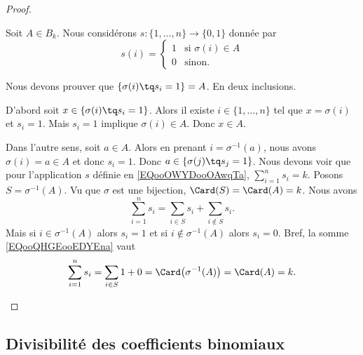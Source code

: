 \begin{proof}
\begin{subproof}
		Soit \( A\in B_k\). Nous considérons \(s \colon \{ 1,\ldots,n \}\to \{ 0,1 \}  \) donnée par
		\begin{equation}		\label{EQooOWYDooOAwqTa}
			s(i)=\begin{cases}
				1 & \text{si } \sigma(i)\in A \\
				0 & \text{sinon. }
			\end{cases}
		\end{equation}
		\begin{subproof}
			\spitem[\( \varphi(s)=A\)]
			Nous devons prouver que \( \{ \sigma(i)\tq s_i=1 \}=A\). En deux inclusions.

			D'abord soit \( x\in\{ \sigma(i)\tq s_i=1 \}\). Alors il existe \( i\in\{ 1,\ldots,n \}\) tel que \( x=\sigma(i)\) et \( s_i=1\). Mais \( s_i=1\) implique \( \sigma(i)\in A\). Donc \( x\in A\).

			Dans l'autre sens, soit \( a\in A\). Alors en prenant \( i=\sigma^{-1}(a)\), nous avons \( \sigma(i)=a\in A\) et donc \( s_i=1\). Donc \( a\in\{ \sigma(j)\tq s_j=1 \}\).
			\spitem[\( s\in C_k\)]
			Nous devons voir que pour l'application \( s\) définie en \eqref{EQooOWYDooOAwqTa}, \( \sum_{i=1}^ns_i=k\). Posons \( S=\sigma^{-1}(A)\). Vu que \( \sigma\) est une bijection, \( \Card(S)=\Card(A)=k\). Nous avons
			\begin{equation}		\label{EQooQHGEooEDYEna}
				\sum_{i=1}^ns_i=\sum_{i\in S}s_i+\sum_{i\not\in S} s_i.
			\end{equation}
			Mais si \( i\in\sigma^{-1}(A)\) alors \( s_i=1\) et si \( i\not\in \sigma^{-1}(A)\) alors \( s_i=0\). Bref, la somme \eqref{EQooQHGEooEDYEna} vaut
			\begin{equation}
				\sum_{i=1}^ns_i=\sum_{i\in S}1+0=\Card\big( \sigma^{-1}(A) \big)=\Card(A)=k.
			\end{equation}
		\end{subproof}
	\end{subproof}
\end{proof}


\subsection{Divisibilité des coefficients binomiaux}

